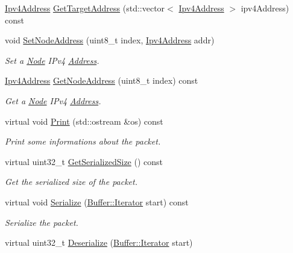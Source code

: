 \begin{DoxyCompactItemize}
\hyperlink{classns3_1_1Ipv4Address}{Ipv4\+Address} \hyperlink{classns3_1_1dsr_1_1DsrOptionRrepHeader_a00b9f882e36a10f366c6fcb4f6c6812d}{Get\+Target\+Address} (std\+::vector$<$ \hyperlink{classns3_1_1Ipv4Address}{Ipv4\+Address} $>$ ipv4\+Address) const 
\item 
void \hyperlink{classns3_1_1dsr_1_1DsrOptionRrepHeader_a2c31b94323ab71ecf56a4932c746a719}{Set\+Node\+Address} (uint8\+\_\+t index, \hyperlink{classns3_1_1Ipv4Address}{Ipv4\+Address} addr)
\begin{DoxyCompactList}\small\item\em Set a \hyperlink{classns3_1_1Node}{Node} I\+Pv4 \hyperlink{classns3_1_1Address}{Address}. \end{DoxyCompactList}\item 
\hyperlink{classns3_1_1Ipv4Address}{Ipv4\+Address} \hyperlink{classns3_1_1dsr_1_1DsrOptionRrepHeader_a38b71bfabd15610e08eb4c3cc20b5d26}{Get\+Node\+Address} (uint8\+\_\+t index) const 
\begin{DoxyCompactList}\small\item\em Get a \hyperlink{classns3_1_1Node}{Node} I\+Pv4 \hyperlink{classns3_1_1Address}{Address}. \end{DoxyCompactList}\item 
virtual void \hyperlink{classns3_1_1dsr_1_1DsrOptionRrepHeader_a6079d4aeafb8edfa2aafad34590ed331}{Print} (std\+::ostream \&os) const 
\begin{DoxyCompactList}\small\item\em Print some informations about the packet. \end{DoxyCompactList}\item 
virtual uint32\+\_\+t \hyperlink{classns3_1_1dsr_1_1DsrOptionRrepHeader_adc4d1871dbb978c75e0ca92cf9af387c}{Get\+Serialized\+Size} () const 
\begin{DoxyCompactList}\small\item\em Get the serialized size of the packet. \end{DoxyCompactList}\item 
virtual void \hyperlink{classns3_1_1dsr_1_1DsrOptionRrepHeader_a9b89851c2b6fd631c9801749f6b765e8}{Serialize} (\hyperlink{classns3_1_1Buffer_1_1Iterator}{Buffer\+::\+Iterator} start) const 
\begin{DoxyCompactList}\small\item\em Serialize the packet. \end{DoxyCompactList}\item 
virtual uint32\+\_\+t \hyperlink{classns3_1_1dsr_1_1DsrOptionRrepHeader_a712214d2e33913f631092ddaccfdb774}{Deserialize} (\hyperlink{classns3_1_1Buffer_1_1Iterator}{Buffer\+::\+Iterator} start)

\end{DoxyCompactItemize}
